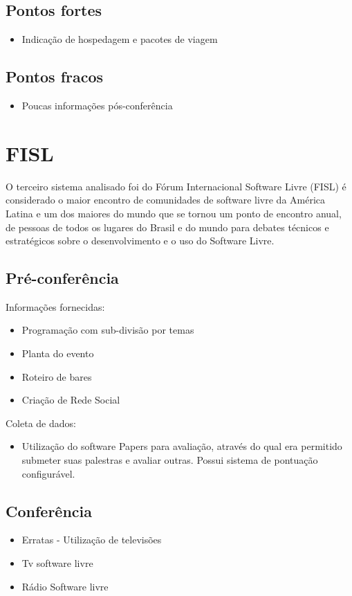 \documentclass[letter]{article}
\begin{document}
\subsection{Pontos fortes}
\begin{itemize}
\item Indicação de hospedagem e pacotes de viagem
\end{itemize}


\subsection{Pontos fracos}
\begin{itemize}
\item Poucas informações pós-conferência
\end{itemize}



\section{FISL}
O terceiro sistema analisado foi do Fórum Internacional Software Livre (FISL) é considerado o maior encontro de comunidades de software livre da América Latina e um dos maiores do mundo que se tornou um ponto de encontro anual, de pessoas de todos os lugares do Brasil e do mundo para debates técnicos e estratégicos sobre o desenvolvimento e o uso do Software Livre.


\subsection{Pré-conferência}
Informações fornecidas:
\begin{itemize}
\item Programação com sub-divisão por temas
\item Planta do evento
\item Roteiro de bares
\item Criação de Rede Social
\end{itemize}
Coleta de dados:
\begin{itemize}
\item Utilização do software Papers para avaliação, através do qual era permitido submeter suas palestras e avaliar outras. Possui sistema de pontuação configurável.  
\end{itemize}
\subsection{Conferência}
\begin{itemize}
\item Erratas - Utilização de televisões
\item Tv software livre
\item Rádio Software livre
\end{itemize}
\end{document}

